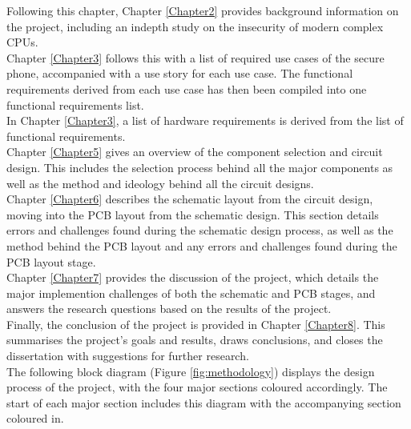 Following this chapter, Chapter \ref{Chapter2} provides background information on the project, including an indepth study on the insecurity of modern complex CPUs.\\ 
Chapter \ref{Chapter3} follows this with a list of required use cases of the secure phone, accompanied with a use story for each use case.
The functional requirements derived from each use case has then been compiled into one functional requirements list.\\ 
In Chapter \ref{Chapter3}, a list of hardware requirements is derived from the list of functional requirements.\\
Chapter \ref{Chapter5} gives an overview of the component selection and circuit design. 
This includes the selection process behind all the major components as well as the method and ideology behind all the circuit designs.\\
Chapter \ref{Chapter6} describes the schematic layout from the circuit design, moving into the PCB layout from the schematic design.
This section details errors and challenges found during the schematic design process, as well as the method behind the PCB layout and any errors and challenges found during the PCB layout stage.\\
Chapter \ref{Chapter7} provides the discussion of the project, which details the major implemention challenges of both the schematic and PCB stages, and answers the research questions based on the results of the project.\\
Finally, the conclusion of the project is provided in Chapter \ref{Chapter8}.
This summarises the project's goals and results, draws conclusions, and closes the dissertation with suggestions for further research.\\
The following block diagram (Figure \ref{fig:methodology}) displays the design process of the project, with the four major sections coloured accordingly. The start of each major section includes this diagram with the accompanying section coloured in. 

